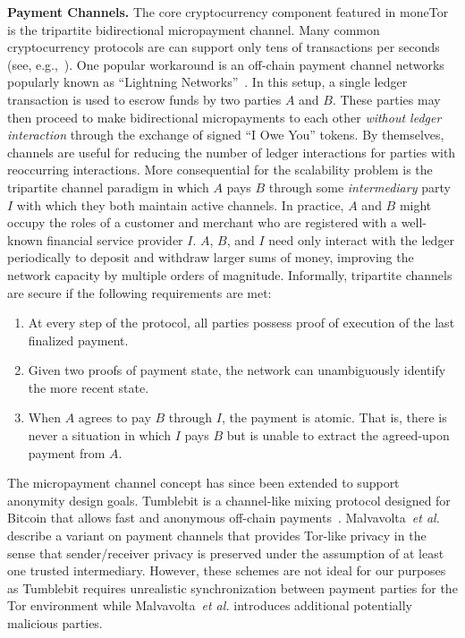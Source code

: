 \medskip
\noindent\textbf{Payment Channels.} The core cryptocurrency component featured
in moneTor is the tripartite bidirectional micropayment channel. Many
common cryptocurrency protocols are can support only tens of
transactions per seconds (see, e.g.,~\cite{team2018blockchain}). One
popular workaround is an off-chain payment channel networks popularly known as
``Lightning Networks''~\cite{poon2016bitcoin}. In this setup, a single ledger
transaction is used to escrow funds by two parties $A$ and $B$. These parties
may then proceed to make bidirectional micropayments to each other \emph{without
  ledger interaction} through the exchange of signed ``I Owe You'' tokens. By
themselves, channels are useful for reducing the number of ledger interactions
for parties with reoccurring interactions. More consequential for the
scalability problem is the tripartite channel paradigm in which $A$ pays $B$
through some \emph{intermediary} party $I$ with which they both maintain active
channels. In practice, $A$ and $B$ might occupy the roles of a customer and
merchant who are registered with a well-known financial service provider $I$.
$A$, $B$, and $I$ need only interact with the ledger periodically to deposit and
withdraw larger sums of money, improving the network capacity by multiple orders
of magnitude. Informally, tripartite channels are secure if the following
requirements are met:

\begin{enumerate}
\item At every step of the protocol, all parties possess proof of execution of
  the last finalized payment.
\item Given two proofs of payment state, the network can unambiguously identify
  the more recent state.
\item When $A$ agrees to pay $B$ through $I$, the payment is atomic. That is,
  there is never a situation in which $I$ pays $B$ but is unable to extract the
  agreed-upon payment from $A$.
\end{enumerate}


 The micropayment channel concept has since been extended to support anonymity
 design goals. Tumblebit is a channel-like mixing protocol designed for Bitcoin
 that allows fast and anonymous off-chain payments~\cite{heilman2017tumblebit}.
 Malvavolta~\textit{et al.}~\cite{malavolta2017concurrency} describe a variant on
 payment channels that provides Tor-like privacy in the sense that
 sender/receiver privacy is preserved under the assumption of at least one
 trusted intermediary. However, these schemes are not ideal for our purposes as
 Tumblebit requires unrealistic synchronization between payment parties for the
 Tor environment while Malvavolta~\textit{et al.} introduces additional
 potentially malicious parties.

